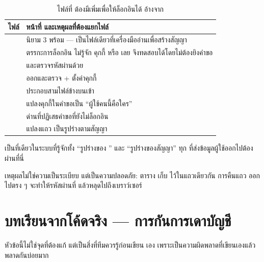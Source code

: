 \begin{table}[htbp]
\centering
\footnotesize\sansall
\caption{ไฟล์ที่  ต้องมีเพิ่มเพื่อให้ล็อกอินได้ อ้างจาก }
\label{tab:befiles}
\begin{tabular}{@{}L{4.0cm}L{9.0cm}@{}}
\toprule
\textbf{ไฟล์} & \textbf{หน้าที่ และเหตุผลที่ต้องแยกไฟล์} \\
\midrule
{} & นิยาม 3  พร้อม  ---
เป็นไฟล์เดียวที่เครื่องมืออ่านเพื่อสร้างสัญญา \\
\addlinespace[2pt]
 & ตรรกะการล็อกอิน ไม่รู้จัก  คุกกี้ หรือ 
เลย จึงทดสอบได้โดยไม่ต้องยิงคำขอ \\
\addlinespace[2pt]
 &  และตรวจรหัสผ่านด้วย  \\
\addlinespace[2pt]
 & ออกและตรวจ  + ตั้งค่าคุกกี้ \\
\addlinespace[2pt]
 & ประกอบสามไฟล์ข้างบนเข้า  \\
\addlinespace[2pt]
 & แปลงคุกกี้ในคำขอเป็น ``ผู้ใช้คนนี้คือใคร'' \\
\addlinespace[2pt]
 & ด่านที่ปฏิเสธคำขอที่ยังไม่ล็อกอิน \\
\addlinespace[2pt]
 & แปลงแถว  เป็นรูปร่างตามสัญญา \\
\bottomrule
\end{tabular}
\end{table}

\begin{keybox}[title={ไฟล์ที่สำคัญที่สุดในตารางคือ \code{user.mapper.ts}}]
เป็นที่เดียวในระบบที่รู้จักทั้ง ``รูปร่างของ '' และ ``รูปร่างของสัญญา''
ทุก  ที่ส่งข้อมูลผู้ใช้ออกไปต้องผ่านที่นี่

เหตุผลไม่ใช่ความเป็นระเบียบ แต่เป็นความปลอดภัย: ตาราง 
เก็บ  ไว้ในแถวเดียวกัน การคืนแถว 
ออกไปตรง ๆ จะทำให้รหัสผ่านที่  แล้วหลุดไปถึงเบราว์เซอร์
\end{keybox}

\section{บทเรียนจากโค้ดจริง --- การกันการเดาบัญชี}

หัวข้อนี้ไม่ใช่จุดที่ต้องแก้ แต่เป็นสิ่งที่ทีมควรรู้ก่อนเขียน  เอง
เพราะเป็นความผิดพลาดที่เขียนเองแล้วพลาดกันบ่อยมาก

